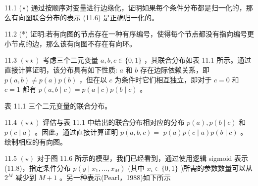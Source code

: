 \documentclass[10pt]{report}
\begin{document}
11.1 (⋆) 通过按顺序对变量进行边缘化，证明如果每个条件分布都是归一化的，那么有向图联合分布的表示 (11.6) 是正确归一化的。

11.2 (*) 证明:若有向图的节点存在一种有序编号，使得每个节点都没有指向编号更小节点的边，那么该有向图不存在有向环。

11.3 \(\left( {\star  \star  }\right)\) 考虑三个二元变量 \(a,b,c \in  \{ 0,1\}\) ，其联合分布如表 11.1 所示。通过直接计算证明，该分布具有如下性质: \(a\) 和 \(b\) 存在边际依赖关系，即 \(p\left( {a,b}\right)  \neq  p\left( a\right) p\left( b\right)\) ，但在以 \(c\) 为条件时它们相互独立，即对于 \(c = 0\) 和 \(c = 1\) 都有 \(p\left( {a,b \mid  c}\right)  = p\left( {a \mid  c}\right) p\left( {b \mid  c}\right)\) 。

表 11.1 三个二元变量的联合分布。

\begin{center}
\end{center}

11.4 \(\left( {\star  \star  }\right)\) 评估与表 11.1 中给出的联合分布相对应的分布 \(p\left( a\right) ,p\left( {b \mid  c}\right)\) 和 \(p\left( {c \mid  a}\right)\) 。因此，通过直接计算证明 \(p\left( {a,b,c}\right)  =\)  \(p\left( a\right) p\left( {c \mid  a}\right) p\left( {b \mid  c}\right)\) 。绘制相应的有向图。

11.5 \(\left( \star \right)\) 对于图 11.6 所示的模型，我们已经看到，通过使用逻辑 sigmoid 表示(11.8)，指定条件分布 \(p\left( {y \mid  {x}_{1},\ldots ,{x}_{M}}\right)\) (其中 \({x}_{i} \in  \{ 0,1\}\) )所需的参数数量可以从 \({2}^{M}\) 减少到 \(M + 1\) 。另一种表示(Pearl，1988)如下所示
\end{document}
